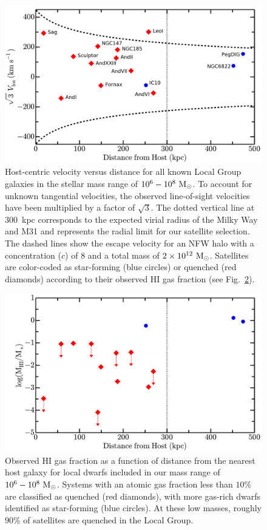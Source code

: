 \begin{figure}
 \centering
 \hspace*{-0.05in}
 \includegraphics[width=6.5in]{ch1_f1.pdf}
 \caption{Host-centric velocity versus distance for all known Local
   Group galaxies in the stellar mass range of
   $10^{6}-10^{8}~{\rm M}_{\odot}$. To account for unknown tangential
   velocities, the observed line-of-sight velocities have been multiplied by a
   factor of $\sqrt{3}$. The dotted vertical line at $300$~kpc
   corresponds to the expected virial radius of the Milky Way and M31
   and represents the radial limit for our satellite selection. The
   dashed lines show the escape velocity for an NFW halo with a
   concentration ($c$) of $8$ and a total mass of $2\times 10^{12}\
   \rm {\rm M}_{\odot}$. Satellites are color-coded as star-forming (blue
   circles) or quenched (red diamonds) according to their observed
   H{\scriptsize I} gas fraction (see
   Fig.~\ref{fig:h1}). }
 \label{fig:vlos}
\end{figure}



\begin{figure}
 \centering
 \hspace*{-0.08in}
 \includegraphics[width=6.5in]{ch1_f2.pdf}
 \caption{Observed H{\scriptsize I} gas fraction as a function of
   distance from the nearest host galaxy for local dwarfs included in
   our mass range of $10^6-10^{8}~{\rm M}_{\odot}$. Systems with an atomic gas
   fraction less than $10\%$ are classified as quenched (red
   diamonds), with more gas-rich dwarfs identified as star-forming
   (blue circles). At these low masses, roughly $90\%$ of satellites
   are quenched in the Local Group.}
 \label{fig:h1}
\end{figure}

